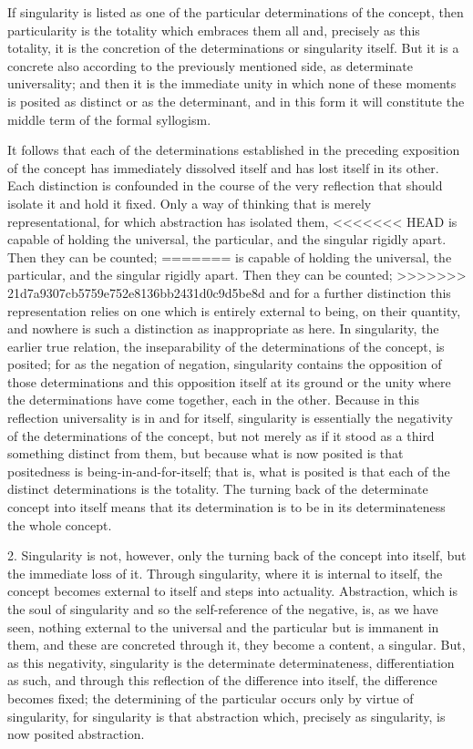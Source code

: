 If singularity is listed as one of the
particular determinations of the concept,
then particularity is the totality
which embraces them all
and, precisely as this totality,
it is the concretion of the determinations
or singularity itself.
But it is a concrete also according
to the previously mentioned side,
as determinate universality;
and then it is the immediate unity
in which none of these moments is posited
as distinct or as the determinant,
and in this form it will constitute
the middle term of the formal syllogism.

It follows that each of the determinations
established in the preceding exposition of the concept
has immediately dissolved itself
and has lost itself in its other.
Each distinction is confounded
in the course of the very reflection
that should isolate it and hold it fixed.
Only a way of thinking that is merely representational,
for which abstraction has isolated them,
<<<<<<< HEAD
is capable of holding the universal, the particular, 
and the singular rigidly apart.
Then they can be counted; 
=======
is capable of holding the universal, the particular,
and the singular rigidly apart.
Then they can be counted;
>>>>>>> 21d7a9307cb5759e752e8136bb2431d0c9d5be8d
and for a further distinction
this representation relies on one
which is entirely external to being,
on their quantity,
and nowhere is such a distinction as inappropriate as here.
In singularity, the earlier true relation,
the inseparability of the determinations of the concept,
is posited;
for as the negation of negation,
singularity contains the opposition
of those determinations
and this opposition itself at its ground
or the unity where the determinations have
come together, each in the other.
Because in this reflection
universality is in and for itself,
singularity is essentially the negativity of
the determinations of the concept,
but not merely as if it stood as
a third something distinct from them,
but because what is now posited is
that positedness is being-in-and-for-itself;
that is, what is posited is that
each of the distinct determinations is the totality.
The turning back of the determinate concept into itself
means that its determination is to be
in its determinateness the whole concept.

2. Singularity is not, however, only the turning back
of the concept into itself, but the immediate loss of it.
Through singularity, where it is internal to itself,
the concept becomes external to itself and steps into actuality.
Abstraction, which is the soul of singularity
and so the self-reference of the negative,
is, as we have seen, nothing external to
the universal and the particular
but is immanent in them,
and these are concreted through it,
they become a content, a singular.
But, as this negativity, singularity is
the determinate determinateness, differentiation as such,
and through this reflection of the difference into itself,
the difference becomes fixed;
the determining of the particular occurs
only by virtue of singularity,
for singularity is that abstraction which,
precisely as singularity,
is now posited abstraction.

